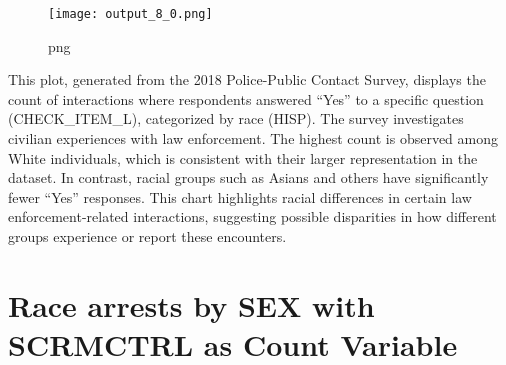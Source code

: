\documentclass[
  letterpaper,
  DIV=11,
  numbers=noendperiod]{scrreprt}
\begin{document}
\begin{figure}[H]

{\centering \texttt{[image: output\_8\_0.png]}

}

\caption{png}

\end{figure}%

This plot, generated from the 2018 Police-Public Contact Survey,
displays the count of interactions where respondents answered ``Yes'' to
a specific question (CHECK\_ITEM\_L), categorized by race (HISP). The
survey investigates civilian experiences with law enforcement. The
highest count is observed among White individuals, which is consistent
with their larger representation in the dataset. In contrast, racial
groups such as Asians and others have significantly fewer ``Yes''
responses. This chart highlights racial differences in certain law
enforcement-related interactions, suggesting possible disparities in how
different groups experience or report these encounters.

\section{Race arrests by SEX with SCRMCTRL as Count
Variable}\label{race-arrests-by-sex-with-scrmctrl-as-count-variable}
\end{document}
